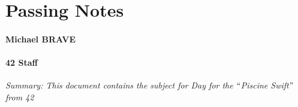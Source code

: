 \documentclass[12pt]{report}
\begin{document}
\vspace{\baselineskip}

\vspace{\baselineskip}

\vspace{\baselineskip}

\vspace{\baselineskip}

\vspace{\baselineskip}
\par

\section*{Passing Notes}

\vspace{\baselineskip}

\vspace{\baselineskip}
\paragraph*{Michael BRAVE }
\paragraph*{42 Staff }

\vspace{\baselineskip}

\vspace{\baselineskip}

\vspace{\baselineskip}

\vspace{\baselineskip}
\begin{Center}
\textit{Summary: This document contains the subject for Day for the $``$Piscine Swift$"$  from 42}
\end{Center}\par


\vspace{\baselineskip}

\vspace{\baselineskip}

\vspace{\baselineskip}

\vspace{\baselineskip}

\vspace{\baselineskip}
\end{document}
